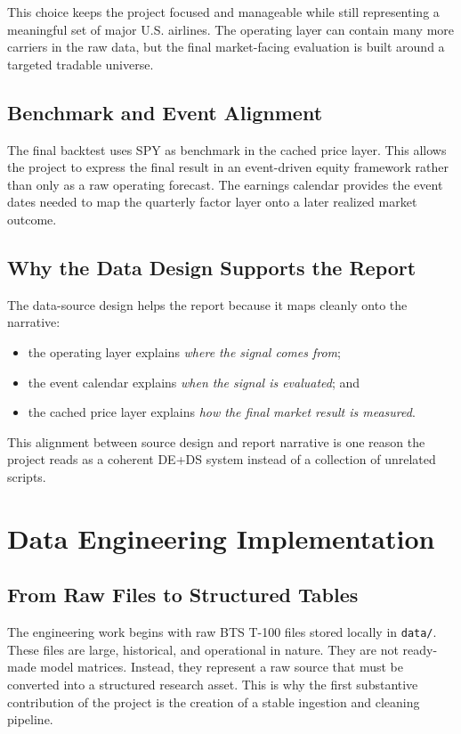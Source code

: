\documentclass[11pt,a4paper]{article}
\begin{document}
This choice keeps the project focused and manageable while still representing a
meaningful set of major U.S. airlines. The operating layer can contain many
more carriers in the raw data, but the final market-facing evaluation is built
around a targeted tradable universe.

\subsection{Benchmark and Event Alignment}

The final backtest uses SPY as benchmark in the cached price layer. This allows
the project to express the final result in an event-driven equity framework
rather than only as a raw operating forecast. The earnings calendar provides
the event dates needed to map the quarterly factor layer onto a later realized
market outcome.

\subsection{Why the Data Design Supports the Report}

The data-source design helps the report because it maps cleanly onto the
narrative:

\begin{itemize}[leftmargin=*]
  \item the operating layer explains \emph{where the signal comes from};
  \item the event calendar explains \emph{when the signal is evaluated}; and
  \item the cached price layer explains \emph{how the final market result is
  measured}.
\end{itemize}

This alignment between source design and report narrative is one reason the
project reads as a coherent DE+DS system instead of a collection of unrelated
scripts.

\section{Data Engineering Implementation}

\subsection{From Raw Files to Structured Tables}

The engineering work begins with raw BTS T-100 files stored locally in
\texttt{data/}. These files are large, historical, and operational in nature.
They are not ready-made model matrices. Instead, they represent a raw source
that must be converted into a structured research asset. This is why the first
substantive contribution of the project is the creation of a stable ingestion
and cleaning pipeline.
\end{document}
